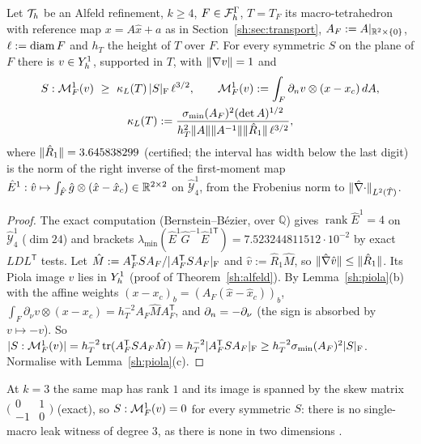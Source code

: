 \begin{lemma}\label{lk:wit}
Let $\mathcal T_h$ be an Alfeld refinement, $k\ge4$, $F\in\mathcal F_h^\Gamma$, $T=T_F$ its macro-tetrahedron with reference map $x=A\hat x+a$ as in Section~\ref{sh:sec:transport}, $A_F:=A|_{\mathbb R^2\times\{0\}}$, $\ell:=\operatorname{diam} F$ and $h_T$ the height of $T$ over $F$. For every symmetric $S$ on the plane of $F$ there is $v\in Y_h^1$, supported in $T$, with $\lVert \nabla v\rVert=1$ and
\begin{gather*}
S:\mathcal M^1_F(v)\ \ge\ \kappa_L(T)\,|S|_{\rm F}\,\ell^{3/2},\qquad \mathcal M^1_F(v):=\int_F\partial_n v\otimes(x-x_c)\,dA,\\
\kappa_L(T):=\frac{\sigma_{\min}(A_F)^2(\det A)^{1/2}}{h_T^2\lVert A\rVert\lVert A^{-1}\rVert\lVert \hat R_1\rVert\,\ell^{3/2}},
\end{gather*}
where $\lVert \hat R_1\rVert=3.645838299$ (certified; the interval has width below the last digit) is the norm of the right inverse of the first-moment map $\hat E^1:\hat v\mapsto\int_{\hat F}\hat g\otimes(\hat x-\hat x_c)\in\mathbb R^{2\times2}$ on $\hat{\mathcal Y}^1_4$, from the Frobenius norm to $\lVert \hat\nabla\cdot\rVert_{L^2(\hat T)}$. 
\end{lemma}
\begin{proof}
The exact computation (Bernstein--B\'ezier, over $\mathbb Q$) gives $\operatorname{rank}\hat E^1=4$ on $\hat{\mathcal Y}^1_4$ ($\dim24$) and brackets $\lambda_{\min}(\hat E^1\hat G^{-1}\hat E^{1\mathsf T})=7.523244811512\cdot10^{-2}$ by exact $LDL^{\mathsf T}$ tests. Let $\hat M:=A_F^{\mathsf T}SA_F/|A_F^{\mathsf T}SA_F|_{\rm F}$ and $\hat v:=\hat R_1\hat M$, so $\lVert \hat\nabla\hat v\rVert\le\lVert \hat R_1\rVert$. Its Piola image $v$ lies in $Y_h^1$ (proof of Theorem~\ref{sh:alfeld}). By Lemma~\ref{sh:piola}(b) with the affine weights $(x-x_c)_b=(A_F(\hat x-\hat x_c))_b$, $\int_F\partial_\nu v\otimes(x-x_c)=h_T^{-2}A_F\hat MA_F^{\mathsf T}$, and $\partial_n=-\partial_\nu$ (the sign is absorbed by $v\mapsto-v$). So $|S:\mathcal M^1_F(v)|=h_T^{-2}\operatorname{tr}(A_F^{\mathsf T}SA_F\hat M)=h_T^{-2}|A_F^{\mathsf T}SA_F|_{\rm F}\ge h_T^{-2}\sigma_{\min}(A_F)^2|S|_{\rm F}$. Normalise with Lemma~\ref{sh:piola}(c).
\end{proof}
At $k=3$ the same map has rank $1$ and its image is spanned by the skew matrix $\bigl(\begin{smallmatrix}0&1\\-1&0\end{smallmatrix}\bigr)$ (exact), so $S:\mathcal M^1_F(v)=0$ for every symmetric $S$: there is no single-macro leak witness of degree $3$, as there is none in two dimensions \cite{PadhiLong2D}.

